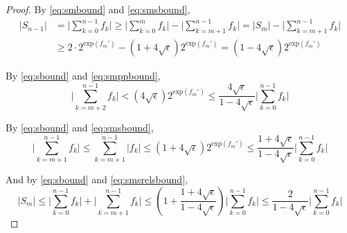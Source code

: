 \documentclass[12pt]{article}
\providecommand{\exp}{\ensuremath{\text{exp}}}
\theoremstyle{definition}
\numberwithin{equation}{section}
\numberwithin{figure}{section}
\begin{document}
\begin{proof}
      By  \eqref{eq:smbound} and \eqref{eq:smsbound},
      \begin{align}
        |S_{n-1}| & = \bigl|\sum\limits_{k = 0}^{n - 1} f_k\bigr| \geq \bigl|\sum\limits_{k = 0}^{m} f_k\bigr| - \bigl|\sum\limits_{k = m + 1}^{n - 1} f_k\bigr| = |S_m| - \bigl|\sum\limits_{k = m + 1}^{n - 1} f_k\bigr| \nonumber \\
        & \geq 2 \cdot 2^{\exp(f_{m}')} - \left(1 + 4 \sqrt\epsilon\right) 2^{\exp(f_m')} = \left(1 - 4 \sqrt\epsilon\right) 2^{\exp(f_m')}
        \label{eq:sbound}
      \end{align}

      By  \eqref{eq:sbound} and \eqref{eq:smppbound},
      \begin{equation}
        \bigl|\sum \limits_{k = m + 2}^{n - 1} f_k\bigr| < \left(4 \sqrt{\epsilon}\right) 2^{\exp(f_m')} \leq \frac{4 \sqrt\epsilon}{1 - 4  \sqrt\epsilon}\bigl|\sum\limits_{k = 0}^{n - 1}f_k\bigr|
        \label{eq:smpprelsbound}
      \end{equation}

      By  \eqref{eq:sbound} and \eqref{eq:smsbound},
      \begin{equation}
        \bigl|\sum\limits_{k = m + 1}^{n - 1}f_k\bigr| \leq \sum\limits_{k = m + 1}^{n - 1}|f_k| \leq \left(1 + 4  \sqrt\epsilon\right)2^{\exp(f_m')}\leq \frac{1 + 4  \sqrt\epsilon}{1 - 4  \sqrt\epsilon}\bigl|\sum\limits_{k = 0}^{n - 1}f_k\bigr|
        \label{eq:smsrelsbound}
      \end{equation}

      And by \eqref{eq:sbound} and \eqref{eq:smsrelsbound},
      \begin{equation}
        |S_m| \leq \bigl|\sum\limits_{k = 0}^{n - 1}f_k\bigr| + \bigl|\sum\limits_{k = m + 1}^{n - 1} f_k\bigr| \leq \left(1 + \frac{1 + 4  \sqrt\epsilon}{1 - 4  \sqrt\epsilon}\right)\bigl|\sum\limits_{k = 0}^{n - 1}f_k\bigr| \leq \frac{2}{1 - 4  \sqrt\epsilon}\bigl|\sum\limits_{k = 0}^{n - 1}f_k\bigr|
        \label{eq:smrelsbound}
      \end{equation}


\end{proof}
\end{document}

